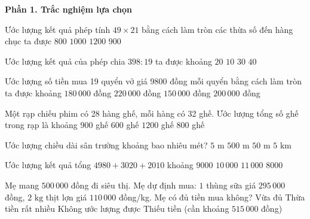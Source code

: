 \textbf{Phần 1. Trắc nghiệm lựa chọn}

\begin{ex} %
Ước lượng kết quả phép tính $49 \times 21$ bằng cách làm tròn các thừa số đến hàng chục ta được
\choice
{$800$}
{\True $1000$}
{$1200$}
{$900$}
\end{ex}

\begin{ex} %
Ước lượng kết quả của phép chia $398 : 19$ ta được khoảng
\choice
{\True $20$}
{$10$}
{$30$}
{$40$}
\end{ex}

\begin{ex} %
Ước lượng số tiền mua 19 quyển vở giá $9800$ đồng mỗi quyển bằng cách làm tròn ta được khoảng
\choice
{$180\,000$ đồng}
{$220\,000$ đồng}
{$150\,000$ đồng}
{\True $200\,000$ đồng}
\end{ex}

\begin{ex} %
Một rạp chiếu phim có 28 hàng ghế, mỗi hàng có 32 ghế. Ước lượng tổng số ghế trong rạp là khoảng
\choice
{\True $900$ ghế}
{$600$ ghế}
{$1200$ ghế}
{$800$ ghế}
\end{ex}

\begin{ex} %
Ước lượng chiều dài sân trường khoảng bao nhiêu mét?
\choice
{$5\text{ m}$}
{$500\text{ m}$}
{\True $50\text{ m}$}
{$5\text{ km}$}
\end{ex}

\begin{ex} %
Ước lượng kết quả tổng $4980 + 3020 + 2010$ khoảng
\choice
{$9000$}
{\True $10\,000$}
{$11\,000$}
{$8000$}
\end{ex}

\begin{ex} %
Mẹ mang $500\,000$ đồng đi siêu thị. Mẹ dự định mua: $1$ thùng sữa giá $295\,000$ đồng, $2\text{ kg}$ thịt lợn giá $110\,000$ đồng/kg. Mẹ có đủ tiền mua không?
\choice
{Vừa đủ}
{Thừa tiền rất nhiều}
{Không ước lượng được}
{\True Thiếu tiền (cần khoảng $515\,000$ đồng)}
\end{ex}

